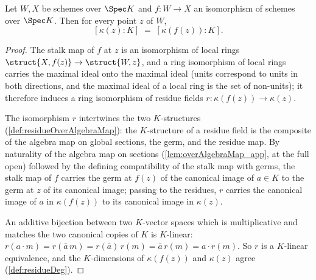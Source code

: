 \begin{lemma}
  \label{lem:residueDeg_eq_of_isIso}
  \leanok
  Let \(W, X\) be schemes over \(\Spec K\) and \(f : W \to X\) an isomorphism of
  schemes over \(\Spec K\). Then for every point \(z\) of \(W\),
  \[
    [\kappa(z) : K] \;=\; [\kappa(f(z)) : K].
  \]
\end{lemma}
\begin{proof}
  \leanok
  The stalk map of \(f\) at \(z\) is an isomorphism of local rings
  \(\struct{X, f(z)} \to \struct{W, z}\), and a ring isomorphism of local rings carries
  the maximal ideal onto the maximal ideal (units correspond to units in both
  directions, and the maximal ideal of a local ring is the set of non-units); it
  therefore induces a ring isomorphism of residue fields
  \(r : \kappa(f(z)) \to \kappa(z)\).

  The isomorphism \(r\) intertwines the two \(K\)-structures
  (\ref{def:residueOverAlgebraMap}): the \(K\)-structure of a residue field is the
  composite of the algebra map on global sections, the germ, and the residue map. By
  naturality of the algebra map on sections (\ref{lem:overAlgebraMap_app}, at the full
  open) followed by the defining compatibility of the stalk map with germs, the stalk
  map of \(f\) carries the germ at \(f(z)\) of the canonical image of \(a \in K\) to
  the germ at \(z\) of its canonical image; passing to the residues, \(r\) carries the
  canonical image of \(a\) in \(\kappa(f(z))\) to its canonical image in
  \(\kappa(z)\).

  An additive bijection between two \(K\)-vector spaces which is multiplicative and
  matches the two canonical copies of \(K\) is \(K\)-linear: \(r(a \cdot m) =
  r(\bar a\, m) = r(\bar a)\, r(m) = \bar a\, r(m) = a \cdot r(m)\). So \(r\) is a
  \(K\)-linear equivalence, and the \(K\)-dimensions of \(\kappa(f(z))\) and
  \(\kappa(z)\) agree (\ref{def:residueDeg}).
\end{proof}

